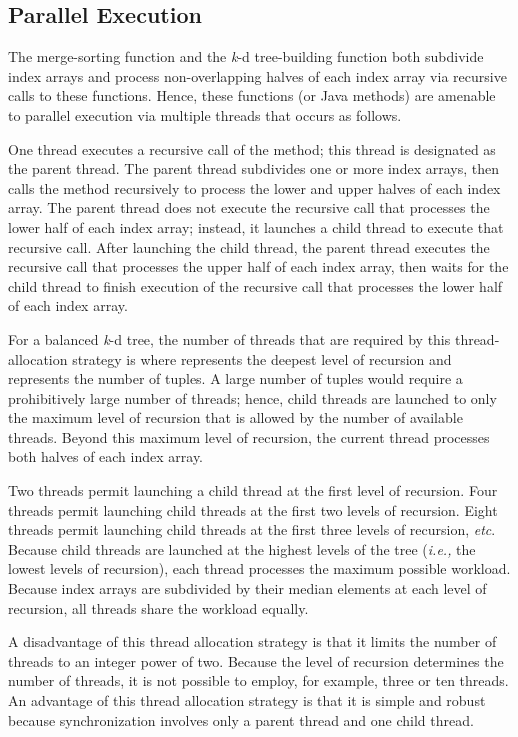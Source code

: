 \documentclass{sig-alternate}
\begin{document}
\subsection{Parallel Execution}
\label{sec:parallel_execution}

The merge-sorting function \cite{Sedgewick} and the  \emph{k}-d tree-building function both subdivide index arrays and process non-overlapping halves of each index array via recursive calls to these functions.  Hence, these functions (or Java methods) are amenable to parallel execution via multiple threads that occurs as follows.

One thread executes a recursive call of the method; this thread is designated as the parent thread.  The parent thread subdivides one or more index arrays, then calls the method recursively to process the lower and upper halves of each index array.  The parent thread does not execute the recursive call that processes the lower half of each index array; instead, it launches a child thread to execute that recursive call.  After launching the child thread, the parent thread executes the recursive call that processes the upper half of each index array, then waits for the child thread to finish execution of the recursive call that processes the lower half of each index array.

For a balanced \emph{k}-d tree, the number of threads  that are required by this thread-allocation strategy is  where  represents the deepest level of recursion and  represents the number of tuples.  A large number of tuples would require a prohibitively large number of threads; hence, child threads are launched to only the maximum level of recursion that is allowed by the number of available threads.  Beyond this maximum level of recursion, the current thread processes both halves of each index array.

Two threads permit launching a child thread at the first level of recursion.  Four threads permit launching child threads at the first two levels of recursion. Eight threads permit launching child threads at the first three levels of recursion, \emph{etc}.  Because child threads are launched at the highest levels of the tree (\emph{i.e.,} the lowest levels of recursion), each thread processes the maximum possible workload.  Because index arrays are subdivided by their median elements at each level of recursion, all threads share the workload equally.

A disadvantage of this thread allocation strategy is that it limits the number of threads to an integer power of two.  Because the level of recursion determines the number of threads, it is not possible to employ, for example, three or ten threads.  An advantage of this thread allocation strategy is that it is simple and robust because synchronization involves only a parent thread and one child thread.
\end{document}
